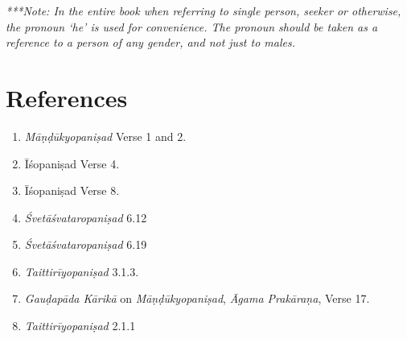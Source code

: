 \emph{***Note: In the entire book when referring to single person, seeker or otherwise, the pronoun `he' is used for convenience. The pronoun should be taken as a reference to a person of any gender, and not just to males.}

\section*{References}

\begin{enumerate}
\itemsep=0pt
\item
	\emph{Māṇḍūkyopaniṣad} Verse 1 and 2.
\item
  Īśopaniṣad Verse 4.
\item
  Īśopaniṣad Verse 8.
\item
  \emph{Śvetāśvataropaniṣad} 6.12
\item
  \emph{Śvetāśvataropaniṣad} 6.19
\item
  \emph{Taittirīyopaniṣad} 3.1.3.
\item
  \emph{Gauḍapāda Kārikā} on \emph{Māṇḍūkyopaniṣad}, \emph{Āgama Prakāraṇa}, Verse 17.
\item
  \emph{Taittirīyopaniṣad} 2.1.1
\end{enumerate}
